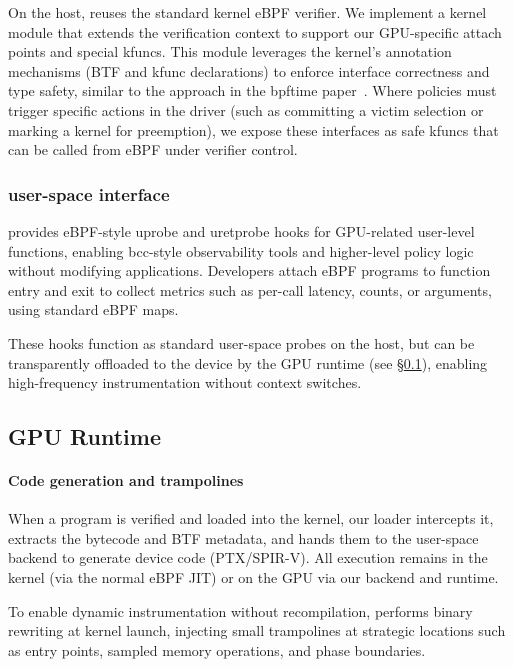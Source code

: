 On the host, \sys reuses the standard kernel eBPF verifier. We implement a kernel module that extends the verification context to support our GPU-specific attach points and special kfuncs. This module leverages the kernel's annotation mechanisms (BTF and kfunc
declarations) to enforce interface correctness and type safety, similar to the approach
in the bpftime paper~\cite{bpftime}. Where policies must trigger specific actions in the driver (such as committing a victim selection or marking a kernel for preemption), we expose these interfaces as safe kfuncs that can be called from eBPF under verifier control.

\subsubsection{\sysdevice user-space interface}

\sysdevice provides eBPF-style uprobe and uretprobe hooks for GPU-related
user-level functions, enabling bcc-style observability tools and higher-level
policy logic without modifying applications. Developers attach eBPF programs to
function entry and exit to collect metrics such as per-call latency, counts, or
arguments, using standard eBPF maps.

These hooks function as standard user-space probes on the host, but can be transparently offloaded to the device by the GPU runtime (see §\ref{sec:impl-gpu}), enabling high-frequency instrumentation without context switches.

\subsection{GPU Runtime}
\label{sec:impl-gpu}

\paragraph{Code generation and trampolines}
When a \sys program is verified and loaded into the kernel, our loader intercepts it, extracts the bytecode and BTF metadata, and hands them to the user-space backend to generate device code (PTX/SPIR-V). All execution remains in the kernel (via the normal eBPF JIT) or on the GPU via our backend and runtime. 

To enable dynamic instrumentation without recompilation, \sys performs binary rewriting at kernel launch, injecting small trampolines at strategic locations such as entry points, sampled memory operations, and phase boundaries.

